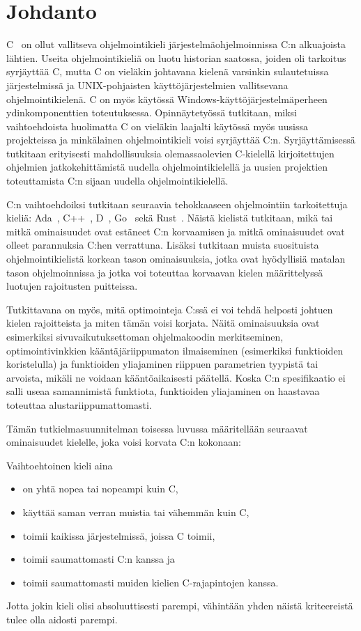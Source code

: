 \section{Johdanto} 

C~\citep{C11} on ollut vallitseva ohjelmointikieli järjestelmäohjelmoinnissa
C:n alkuajoista lähtien. Useita ohjelmointikieliä on luotu historian saatossa,
joiden oli tarkoitus syrjäyttää C, mutta C on vieläkin johtavana kielenä
varsinkin sulautetuissa järjestelmissä ja UNIX-pohjaisten käyttöjärjestelmien
vallitsevana ohjelmointikielenä. C on myös käytössä
Windows-käyttöjärjestelmäperheen ydinkomponenttien toteutuksessa.
Opinnäytetyössä tutkitaan, miksi vaihtoehdoista huolimatta C on vieläkin
laajalti käytössä myös uusissa projekteissa ja minkälainen ohjelmointikieli
voisi syrjäyttää C:n. Syrjäyttämisessä tutkitaan erityisesti mahdollisuuksia
olemassaolevien C-kielellä kirjoitettujen ohjelmien jatkokehittämistä uudella
ohjelmointikielellä ja uusien projektien toteuttamista C:n sijaan uudella
ohjelmointikielellä.

C:n vaihtoehdoiksi tutkitaan seuraavia tehokkaaseen ohjelmointiin tarkoitettuja
kieliä: Ada~\citep{ADA12}, C++~\citep{CPP14}, D~\citep{D}, Go~\citep{golang}
sekä Rust~\citep{rust}. Näistä kielistä tutkitaan, mikä tai mitkä ominaisuudet
ovat estäneet C:n korvaamisen ja mitkä ominaisuudet ovat olleet parannuksia
C:hen verrattuna. Lisäksi tutkitaan muista suosituista ohjelmointikielistä
korkean tason ominaisuuksia, jotka ovat hyödyllisiä matalan tason
ohjelmoinnissa ja jotka voi toteuttaa korvaavan kielen määrittelyssä luotujen
rajoitusten puitteissa.

Tutkittavana on myös, mitä optimointeja C:ssä ei voi tehdä helposti johtuen
kielen rajoitteista ja miten tämän voisi korjata. Näitä ominaisuuksia ovat
esimerkiksi sivuvaikutuksettoman ohjelmakoodin merkitseminen,
optimointivinkkien kääntäjäriippumaton ilmaiseminen (esimerkiksi funktioiden
koristelulla) ja funktioiden
yliajaminen riippuen parametrien tyypistä tai
arvoista, mikäli ne voidaan kääntöaikaisesti päätellä. Koska C:n spesifikaatio
ei salli useaa samannimistä funktiota, funktioiden yliajaminen on haastavaa
toteuttaa alustariippumattomasti.

Tämän tutkielmasuunnitelman toisessa luvussa määritellään seuraavat
ominaisuudet kielelle, joka voisi korvata C:n kokonaan:

Vaihtoehtoinen kieli aina
\begin{itemize}[topsep=0pt]
    \item on yhtä nopea tai nopeampi kuin C,
    \item käyttää saman verran muistia tai vähemmän kuin C,
    \item toimii kaikissa järjestelmissä, joissa C toimii,
    \item toimii saumattomasti C:n kanssa ja
    \item toimii saumattomasti muiden kielien C-rajapintojen kanssa.
\end{itemize}
Jotta jokin kieli olisi absoluuttisesti parempi, vähintään yhden näistä
kriteereistä tulee olla aidosti parempi.

